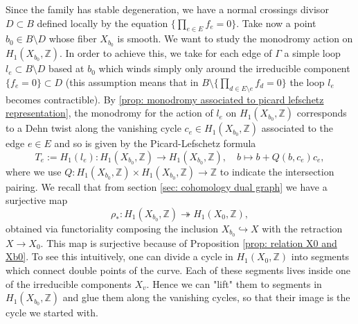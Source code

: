 \documentclass[a4paper,12 pt,titlepage,twoside]{book}
\newcommand{\numberset}{\mathbb}
\newcommand{\Z}{\numberset{Z}}
\theoremstyle{plain}
\theoremstyle{theorem}
\theoremstyle{definition}
\theoremstyle{remark}
\begin{document}
	Since the family has stable degeneration, we have a normal crossings divisor $D \subset B$ defined locally by the equation $\{\prod_{e \in E} f_e=0\}.$ Take now a point $b_0 \in B \setminus D$ whose fiber $X_{b_0}$ is smooth. We want to study the monodromy action on $H_1(X_{b_0},\Z)$. In order to achieve this, we take for each edge of $\Gamma$ a simple loop $l_e \subset B \setminus D$ based at $b_0$ which winds simply only around the irreducible component $\{f_e =0\} \subset D$ (this assumption means that in $B \setminus \{\prod_{d \in E \setminus e} f_d =0\}$ the loop $l_e$ becomes contractible). By \ref{prop: monodromy associated to picard lefschetz representation}, the monodromy for the action of $l_e$ on $H_1(X_{b_0},\Z)$ corresponds to a Dehn twist along the vanishing cycle $c_e \in H_1(X_{b_0},\Z)$ associated to the edge $e \in E$ and so is given by the Picard-Lefschetz formula $$T_e :=H_1(l_e) \colon H_1(X_{b_0},\Z) \rightarrow H_1(X_{b_0},\Z), \quad b \mapsto b + Q (b, c_e) c_e,$$ where we use $Q \colon H_1(X_{b_0},\Z) \times H_1(X_{b_0},\Z) \rightarrow \Z$ to indicate the intersection pairing.
	We recall that from section \ref{sec: cohomology dual graph} we have a surjective map $$\rho_* \colon H_1(X_{b_0},\Z) \twoheadrightarrow H_1(X_0,\Z),$$ obtained via functoriality composing the inclusion $X_{b_0} \hookrightarrow X$ with the retraction $X \rightarrow X_0$. This map is surjective because of Proposition \ref{prop: relation X0 and Xb0}. To see this intuitively, one can divide a cycle in $H_1(X_0,\Z)$ into segments which connect double points of the curve. Each of these segments lives inside one of the irreducible components $X_v$. Hence we can "lift" them to segments in $H_1(X_{b_0},\Z)$ and glue them along the vanishing cycles, so that their image is the cycle we started with.
	
\end{document}
